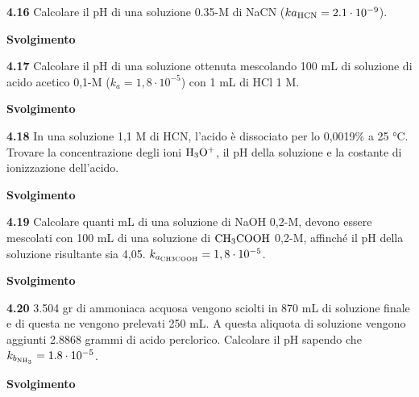 \vspace{0.2cm}

\vspace{0.2cm}\textbf{4.16} Calcolare il pH di una soluzione 0.35-M di NaCN ($k{a_{\rm HCN}} = 2.1 \cdot 10^{-9}$).

\vspace{0.2cm}\large\textbf{Svolgimento}\normalsize

\vspace{0.2cm}

\vspace{0.2cm}\textbf{4.17} Calcolare il pH di una soluzione ottenuta mescolando 100 mL di soluzione di acido acetico 0,1-M ($k_a = 1,8 \cdot 10^{-5}$) con 1 mL di HCl 1 M.

\vspace{0.2cm}\large\textbf{Svolgimento}\normalsize

\vspace{0.2cm}

\vspace{0.2cm}\textbf{4.18}  In una soluzione 1,1 M di HCN, l’acido è dissociato per lo 0,0019\% a 25 °C. Trovare la concentrazione degli ioni $\rm H_3O^+$, il pH della soluzione e la costante di ionizzazione dell'acido. 

\vspace{0.2cm}\large\textbf{Svolgimento}\normalsize

\vspace{0.2cm}

\vspace{0.2cm}\textbf{4.19}  Calcolare quanti mL di una soluzione di NaOH 0,2-M, devono essere mescolati con
100 mL di una soluzione di $\rm CH_3COOH$ 0,2-M, affinché il pH della soluzione risultante sia 4,05. $k_{a_{\rm CH3COOH}}= 1,8 \cdot 10^{-5}$.

\vspace{0.2cm}\large\textbf{Svolgimento}\normalsize

\vspace{0.2cm}

\vspace{0.2cm}\textbf{4.20} 3.504 gr di ammoniaca acquosa vengono sciolti in 870 mL di soluzione finale e di questa ne vengono prelevati 250 mL. A questa aliquota di soluzione vengono aggiunti 2.8868 grammi di acido perclorico. Calcolare il pH sapendo che $k_{b_{\rm NH_3}}=1.8 \cdot 10^{-5}$.

\vspace{0.2cm}\large\textbf{Svolgimento}\normalsize

